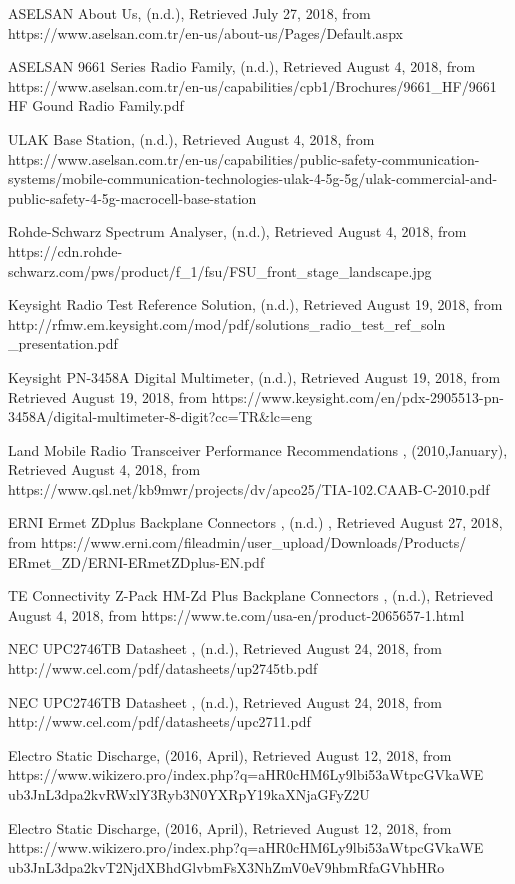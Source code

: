 \begin{thebibliography}{}
 ASELSAN About Us, (n.d.),
Retrieved July 27, 2018, from https://www.aselsan.com.tr/en-us/about-us/Pages/Default.aspx

 ASELSAN 9661 Series Radio Family, (n.d.), 
Retrieved August 4, 2018, from https://www.aselsan.com.tr/en-us/capabilities/cpb1/Brochures/9661\_HF/9661 HF Gound Radio Family.pdf

 ULAK Base Station, (n.d.), 
Retrieved August 4, 2018, from https://www.aselsan.com.tr/en-us/capabilities/public-safety-communication-systems/mobile-communication-technologies-ulak-4-5g-5g/ulak-commercial-and-public-safety-4-5g-macrocell-base-station


 Rohde-Schwarz Spectrum Analyser, (n.d.), 
Retrieved August 4, 2018, from https://cdn.rohde-schwarz.com/pws/product/f\_1/fsu/FSU\_front\_stage\_landscape.jpg

 Keysight Radio Test Reference Solution, (n.d.), 
Retrieved August 19, 2018, from http://rfmw.em.keysight.com/mod/pdf/solutions\_radio\_test\_ref\_soln\\\_presentation.pdf

 Keysight PN-3458A Digital Multimeter, (n.d.), 
Retrieved August 19, 2018, from Retrieved August 19, 2018, from https://www.keysight.com/en/pdx-2905513-pn-3458A/digital-multimeter-8-digit?cc=TR\&lc=eng


 Land Mobile Radio Transceiver Performance Recommendations , (2010,January), Retrieved August 4, 2018, from https://www.qsl.net/kb9mwr/projects/dv/apco25/TIA-102.CAAB-C-2010.pdf



 ERNI Ermet ZDplus Backplane Connectors , (n.d.) , Retrieved August 27, 2018, from https://www.erni.com/fileadmin/user\_upload/Downloads/Products/\\ERmet\_ZD/ERNI-ERmetZDplus-EN.pdf

 TE Connectivity Z-Pack HM-Zd Plus Backplane Connectors , (n.d.), Retrieved August 4, 2018, from https://www.te.com/usa-en/product-2065657-1.html

 NEC UPC2746TB Datasheet , (n.d.), Retrieved August 24, 2018, from http://www.cel.com/pdf/datasheets/up2745tb.pdf

 NEC UPC2746TB Datasheet  , (n.d.), Retrieved August 24, 2018, from http://www.cel.com/pdf/datasheets/upc2711.pdf

 Electro Static Discharge, (2016, April),
Retrieved August 12, 2018, from https://www.wikizero.pro/index.php?q=aHR0cHM6Ly9lbi53aWtpcGVkaWE\\ub3JnL3dpa2kvRWxlY3Ryb3N0YXRpY19kaXNjaGFyZ2U

 Electro Static Discharge, (2016, April),
Retrieved August 12, 2018, from https://www.wikizero.pro/index.php?q=aHR0cHM6Ly9lbi53aWtpcGVkaWE\\ub3JnL3dpa2kvT2NjdXBhdGlvbmFsX3NhZmV0eV9hbmRfaGVhbHRo

\end{thebibliography}

